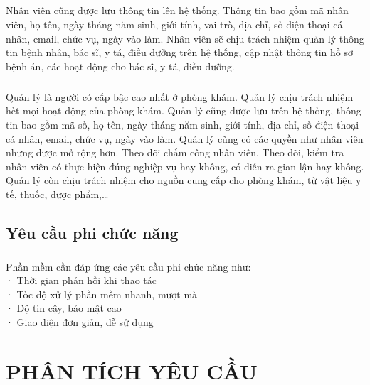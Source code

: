 \documentclass{report}
\begin{document}
	\paragraph{}
	Nhân viên cũng được lưu thông tin lên hệ thống. Thông tin bao gồm mã nhân viên, họ tên, ngày tháng năm sinh, giới tính, vai trò, địa chỉ, số điện thoại cá nhân, email, chức vụ, ngày vào làm. Nhân viên sẽ chịu trách nhiệm quản lý thông tin bệnh nhân, bác sĩ, y tá, điều dưỡng trên hệ thống, cập nhật thông tin hồ sơ bệnh án, các hoạt động cho bác sĩ, y tá, điều dưỡng.
	\paragraph{}
	Quản lý là người có cấp bậc cao nhất ở phòng khám. Quản lý chịu trách nhiệm hết mọi hoạt động của phòng khám. Quản lý cũng được lưu trên hệ thống, thông tin bao gồm mã số, họ tên, ngày tháng năm sinh, giới tính, địa chỉ, số điện thoại cá nhân, email, chức vụ, ngày vào làm. Quản lý cũng có các quyền như nhân viên nhưng được mở rộng hơn. Theo dõi chấm công nhân viên. Theo dõi, kiểm tra nhân viên có thực hiện đúng nghiệp vụ hay không, có diễn ra gian lận hay không. Quản lý còn chịu trách nhiệm cho nguồn cung cấp cho phòng khám, từ vật liệu y tế, thuốc, dược phẩm,…

\section{Yêu cầu phi chức năng}	
	\paragraph{}
	Phần mềm cần đáp ứng các yêu cầu phi chức năng như:\\
	·  Thời gian phản hồi khi thao tác\\
	·  Tốc độ xử lý phần mềm nhanh, mượt mà\\
	·  Độ tin cậy, bảo mật cao\\
	·  Giao diện đơn giản, dễ sử dụng\\

\chapter{PHÂN TÍCH YÊU CẦU}
\end{document}
